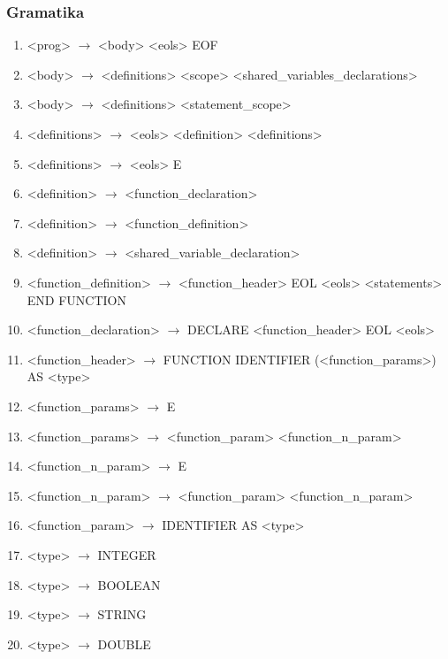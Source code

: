 \subsubsection{Gramatika}
\begin{normalsize}
\begin{enumerate}
\item <prog> $\rightarrow$ <body> <eols> EOF
\item <body> $\rightarrow$ <definitions> <scope> <shared\_variables\_declarations>
\item <body> $\rightarrow$ <definitions> <statement\_scope>

\item <definitions> $\rightarrow$ <eols> <definition> <definitions>
\item <definitions> $\rightarrow$ <eols> E

\item <definition> $\rightarrow$ <function\_declaration>
\item <definition> $\rightarrow$ <function\_definition>
\item <definition> $\rightarrow$ <shared\_variable\_declaration>

\item <function\_definition> $\rightarrow$ <function\_header> EOL <eols> <statements> END FUNCTION
\item <function\_declaration> $\rightarrow$ DECLARE <function\_header> EOL <eols>

\item <function\_header> $\rightarrow$ FUNCTION IDENTIFIER (<function\_params>) AS <type>

\item <function\_params> $\rightarrow$ E
\item <function\_params> $\rightarrow$ <function\_param> <function\_n\_param>

\item <function\_n\_param> $\rightarrow$ E
\item <function\_n\_param> $\rightarrow$ <function\_param> <function\_n\_param>

\item <function\_param> $\rightarrow$ IDENTIFIER AS <type>


\item <type> $\rightarrow$ INTEGER
\item <type> $\rightarrow$ BOOLEAN
\item <type> $\rightarrow$ STRING
\item <type> $\rightarrow$ DOUBLE


\end{enumerate}
\end{normalsize}
